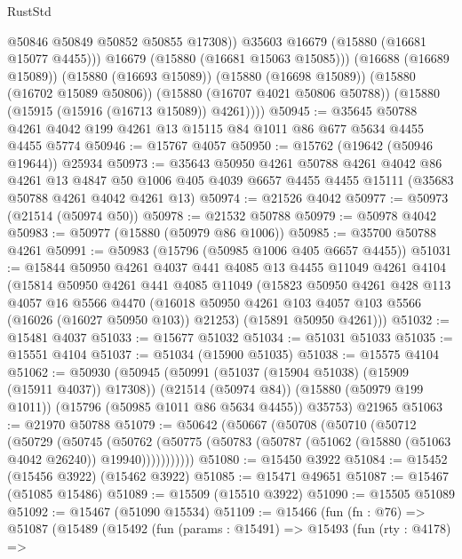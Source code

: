 \begin{lexlean}{RustStd}
\begin{coremodule}
                @50846
                @50849
                @50852
                @50855
                @17308))
            @35603
            @16679
            (@15880 (@16681 @15077 @4455)))
          @16679
          (@15880 (@16681 @15063 @15085)))
        (@16688 (@16689 @15089))
        (@15880 (@16693 @15089))
        (@15880 (@16698 @15089))
        (@15880 (@16702 @15089 @50806))
        (@15880 (@16707 @4021 @50806 @50788))
        (@15880 (@15915 (@15916 (@16713 @15089)) @4261))))
@50945 := @35645 @50788 @4261 @4042 @199 @4261 @13 @15115 @84 @1011 @86 @677 @5634 @4455 @4455 @5774
@50946 := @15767 @4057
@50950 := @15762 (@19642 (@50946 @19644)) @25934
@50973 := @35643
    @50950
    @4261
    @50788
    @4261
    @4042
    @86
    @4261
    @13
    @4847
    @50
    @1006
    @405
    @4039
    @6657
    @4455
    @4455
    @15111
    (@35683 @50788 @4261 @4042 @4261 @13)
@50974 := @21526 @4042
@50977 := @50973 (@21514 (@50974 @50))
@50978 := @21532 @50788
@50979 := @50978 @4042
@50983 := @50977 (@15880 (@50979 @86 @1006))
@50985 := @35700 @50788 @4261
@50991 := @50983 (@15796 (@50985 @1006 @405 @6657 @4455))
@51031 := @15844
    @50950
    @4261
    @4037
    @441
    @4085
    @13
    @4455
    @11049
    @4261
    @4104
    (@15814
      @50950
      @4261
      @441
      @4085
      @11049
      (@15823
        @50950
        @4261
        @428
        @113
        @4057
        @16
        @5566
        @4470
        (@16018 @50950 @4261 @103 @4057 @103 @5566 (@16026 (@16027 @50950 @103)) @21253)
        (@15891 @50950 @4261)))
@51032 := @15481 @4037
@51033 := @15677 @51032
@51034 := @51031 @51033
@51035 := @15551 @4104
@51037 := @51034 (@15900 @51035)
@51038 := @15575 @4104
@51062 := @50930
    (@50945
      (@50991 (@51037 (@15904 @51038) (@15909 (@15911 @4037)) @17308))
      (@21514 (@50974 @84))
      (@15880 (@50979 @199 @1011))
      (@15796 (@50985 @1011 @86 @5634 @4455))
      @35753)
    @21965
@51063 := @21970 @50788
@51079 := @50642
    (@50667
      (@50708
        (@50710
          (@50712
            (@50729
              (@50745
                (@50762
                  (@50775 (@50783 (@50787 (@51062 (@15880 (@51063 @4042 @26240)) @19940)))))))))))
@51080 := @15450 @3922
@51084 := @15452 (@15456 @3922) (@15462 @3922)
@51085 := @15471 @49651
@51087 := @15467 (@51085 @15486)
@51089 := @15509 (@15510 @3922)
@51090 := @15505 @51089
@51092 := @15467 (@51090 @15534)
@51109 := @15466
    (fun (fn : @76) =>
    @51087
      (@15489
        (@15492
          (fun (params : @15491) =>
          @15493
            (fun (rty : @4178) =>

\end{coremodule}
\end{lexlean}
